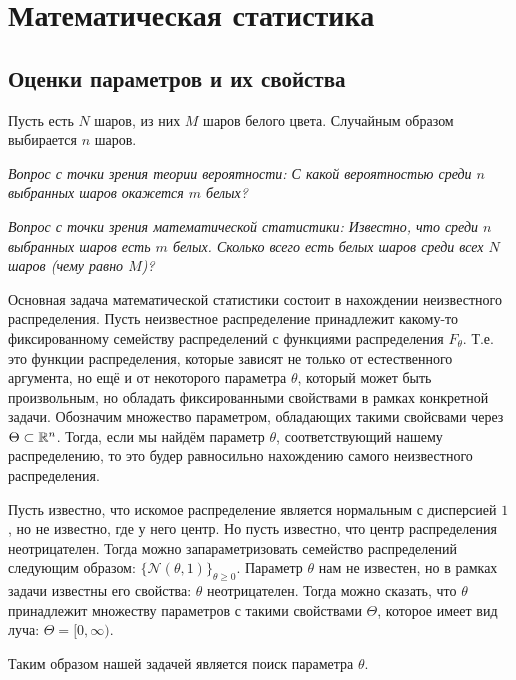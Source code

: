 \section{Математическая статистика}
\subsection{Оценки параметров и их свойства}
\begin{example}
    Пусть есть $N$ шаров, из них $M$ шаров белого цвета. Случайным образом выбирается $n$ шаров.

    \it{Вопрос с точки зрения теории вероятности:} С какой вероятностью среди $n$ выбранных шаров окажется $m$ белых?

    \it{Вопрос с точки зрения математической статистики:} Известно, что среди $n$ выбранных шаров есть $m$ белых. Сколько всего
    есть белых шаров среди всех $N$ шаров (чему равно $M$)?
\end{example}
Основная задача математической статистики состоит в нахождении неизвестного распределения. Пусть неизвестное распределение
принадлежит какому-то фиксированному семейству распределений с функциями распределения $F_{\theta}$. Т.е. это функции распределения,
которые зависят не только от естественного аргумента, но ещё и от некоторого параметра $\theta$, который может быть произвольным,
но обладать фиксированными свойствами в рамках конкретной задачи. Обозначим множество параметром, обладающих такими свойсвами через
 $\Theta \subset \mathbb{R}^n$. Тогда, если мы найдём параметр $\theta$, соответствующий нашему распределению, то это будер равносильно
нахождению самого неизвестного распределения.
\begin{example}
    Пусть известно, что искомое распределение является нормальным с дисперсией $1$, но не известно, где у него центр. Но пусть
    известно, что центр распределения неотрицателен. Тогда можно запараметризовать семейство распределений следующим образом:
    $\{\mathcal{N}(\theta, 1)\}_{\theta \geq 0}$. Параметр $\theta$ нам не известен, но в рамках задачи известны его свойства:
    $\theta$ неотрицателен. Тогда можно сказать, что $\theta$ принадлежит множеству параметров с такими свойствами $\Theta$,
    которое имеет вид луча: $\Theta = [0, \infty)$.
\end{example}
Таким образом нашей задачей является поиск параметра $\theta$.

